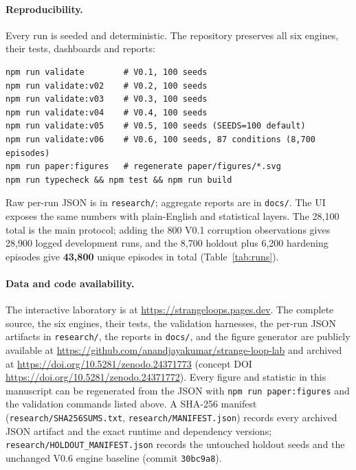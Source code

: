 \documentclass{article}
\begin{document}
\paragraph{Reproducibility.}
Every run is seeded and deterministic. The repository preserves all six engines, their tests, dashboards and reports:
\begin{verbatim}
npm run validate        # V0.1, 100 seeds
npm run validate:v02    # V0.2, 100 seeds
npm run validate:v03    # V0.3, 100 seeds
npm run validate:v04    # V0.4, 100 seeds
npm run validate:v05    # V0.5, 100 seeds (SEEDS=100 default)
npm run validate:v06    # V0.6, 100 seeds, 87 conditions (8,700 episodes)
npm run paper:figures   # regenerate paper/figures/*.svg
npm run typecheck && npm test && npm run build
\end{verbatim}
Raw per-run JSON is in \texttt{research/}; aggregate reports are in \texttt{docs/}. The UI exposes the same numbers with plain-English and statistical layers. The 28{,}100 total is the main protocol; adding the 800 V0.1 corruption observations gives 28{,}900 logged development runs, and the 8{,}700 holdout plus 6{,}200 hardening episodes give \textbf{43{,}800} unique episodes in total (Table~\ref{tab:runs}).

\paragraph{Data and code availability.}
The interactive laboratory is at \url{https://strangeloops.pages.dev}. The complete source, the six engines, their tests, the validation harnesses, the per-run JSON artifacts in \texttt{research/}, the reports in \texttt{docs/}, and the figure generator are publicly available at \url{https://github.com/anandjayakumar/strange-loop-lab} and archived at \url{https://doi.org/10.5281/zenodo.24371773} (concept DOI \url{https://doi.org/10.5281/zenodo.24371772}). Every figure and statistic in this manuscript can be regenerated from the JSON with \texttt{npm run paper:figures} and the validation commands listed above. A SHA-256 manifest (\texttt{research/SHA256SUMS.txt}, \texttt{research/MANIFEST.json}) records every archived JSON artifact and the exact runtime and dependency versions; \texttt{research/HOLDOUT\_MANIFEST.json} records the untouched holdout seeds and the unchanged V0.6 engine baseline (commit \texttt{30bc9a8}).
\end{document}
